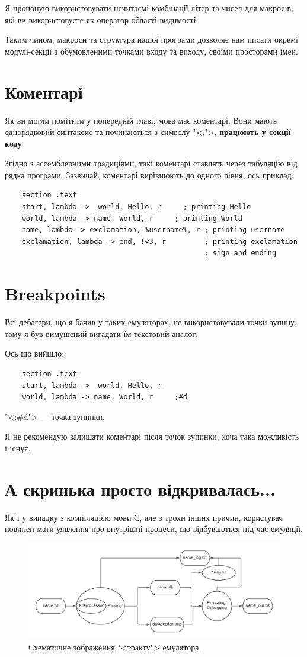 \documentclass[oneside,final,14pt]{extreport}
\begin{document}
Я пропоную використовувати нечитаємі комбінації літер та чисел для макросів, які ви використовуєте як оператор області видимості.
		
Таким чином, макроси та структура нашої програми дозволяє нам писати окремі модулі-секції з обумовленими точками входу та виходу, своїми просторами імен.
\section{Коментарі}

Як ви могли помітити у попередній главі, мова має коментарі. Вони мають однорядковий синтаксис та починаються з символу "<;">, {\bfseries працюють у секції коду}.

Згідно з ассемблерними традиціями, такі коментарі ставлять через табуляцію від рядка програми. Зазвичай, коментарі вирівнюють до одного рівня, ось приклад:

\begin{Verbatim}
	section .text
	start, lambda ->  world, Hello, r	  ; printing Hello
	world, lambda -> name, World, r	    ; printing World
	name, lambda -> exclamation, %username%, r ; printing username
	exclamation, lambda -> end, !<3, r         ; printing exclamation
	                                           ; sign and ending
\end{Verbatim}
\section{Breakpoints}
Всі дебагери, що я бачив у таких емуляторах, не використовували точки зупину, тому я був вимушений вигадати їм текстовий аналог.

Ось що вийшло:

\begin{Verbatim}
	section .text
	start, lambda ->  world, Hello, r	  
	world, lambda -> name, World, r	    ;#d
\end{Verbatim}
"<;\#d"> --- точка зупинки. 

Я не рекомендую залишати коментарі після точок зупинки, хоча така можливість і існує.
\section{А скринька просто відкривалась...}
\label{chap:emulator:func}
Як і у випадку з компіляцією мови С, але з трохи інших причин, користувач повинен мати уявлення про внутрішні процеси, що відбуваються під час емуляції.

\begin{figure}
\includegraphics[scale=0.8]{2}
\caption{Схематичне зображення "<тракту"> емулятора.}
\end{figure}
\end{document}
